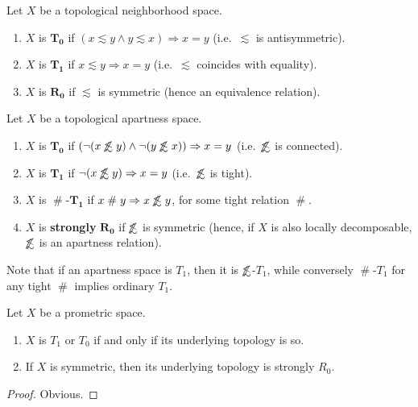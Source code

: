 \documentclass{article}
\def\apart{\mathrel{\#}}
\def\oapt{\mathrel{\!\not\,\not\lesssim}}
\def\leapx{\lesssim}
\let\implies\Rightarrow
\begin{document}
\begin{defn}
  Let $X$ be a topological neighborhood space.
  \begin{enumerate}
  \item $X$ is $\mathbf{T_0}$ if $(x\leapx y \land y\leapx x) \implies x=y$ (i.e.\ $\leapx$ is antisymmetric).
  \item $X$ is $\mathbf{T_1}$ if $x\leapx y \implies x=y$ (i.e.\ $\leapx$ coincides with equality).
  \item $X$ is $\mathbf{R_0}$ if $\leapx$ is symmetric (hence an equivalence relation).
  \end{enumerate}
  Let $X$ be a topological apartness space.
  \begin{enumerate}
  \item $X$ is $\mathbf{T_0}$ if $(\neg(x\oapt y) \land \neg(y\oapt x)) \implies x=y$ (i.e.\ $\oapt$ is connected).
  \item $X$ is $\mathbf{T_1}$ if $\neg(x\oapt y)\implies x=y$ (i.e.\ $\oapt$ is tight).
  \item $X$ is $\apart$-$\mathbf{T_1}$ if $x\apart y \implies x\oapt y$, for some tight relation $\apart$.
  \item $X$ is \textbf{strongly} $\mathbf{R_0}$ if $\oapt$ is symmetric (hence, if $X$ is also locally decomposable, $\oapt$ is an apartness relation).
  \end{enumerate}
\end{defn}

Note that if an apartness space is $T_1$, then it is $\oapt$-$T_1$, while conversely $\apart$-$T_1$ for any tight $\apart$ implies ordinary $T_1$.

\begin{thm}
  Let $X$ be a prometric space.
  \begin{enumerate}
  \item $X$ is $T_1$ or $T_0$ if and only if its underlying topology is so.
  \item If $X$ is symmetric, then its underlying topology is strongly $R_0$.
  \end{enumerate}
\end{thm}
\begin{proof}
  Obvious.
\end{proof}
\end{document}
